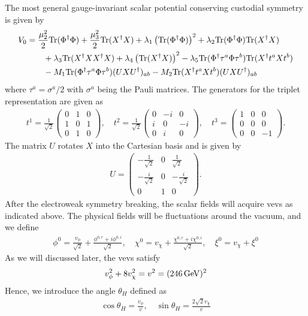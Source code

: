 \documentclass[12pt]{article}
\begin{document}
The most general gauge-invariant scalar potential conserving custodial symmetry is given by
\begin{align}
    \label{equ:V0}
    V_0 &= \frac{\mu_2^2}{2}{\rm Tr}(\Phi^\dagger\Phi)+\frac{\mu_3^2}{2}{\rm Tr}(X^\dagger X) + \lambda_1\left({\rm Tr}(\Phi^\dagger\Phi)\right)^2 + \lambda_2{\rm Tr}(\Phi^\dagger\Phi){\rm Tr}(X^\dagger X) \nonumber \\
    & \qquad + \lambda_3{\rm Tr}(X^\dagger X X^\dagger X) + \lambda_4\left({\rm Tr}(X^\dagger X)\right)^2 - \lambda_5{\rm Tr}(\Phi^\dagger \tau^a\Phi\tau^b){\rm Tr}(X^\dagger t^a X t^b) \nonumber \\
    &\qquad- M_1 {\rm Tr}(\Phi^\dagger \tau^a \Phi \tau^b)(UXU^\dagger)_{ab} - M_2 {\rm Tr}(X^\dagger t^a X t^b)(UXU^\dagger)_{ab}
\end{align}
where $\tau^a=\sigma^a/2$ with $\sigma^a$ being the Pauli matrices. The generators for the triplet representation are given as
\begin{align}
    t^1 = \frac{1}{\sqrt{2}}\begin{pmatrix}
        0 & 1 & 0 \\
        1 & 0 & 1 \\
        0 & 1 & 0
    \end{pmatrix}, \quad t^2=\frac{1}{\sqrt{2}}\begin{pmatrix}
        0 & -i & 0 \\
        i & 0 & -i \\
        0 & i & 0
    \end{pmatrix}, \quad t^3=\begin{pmatrix}
        1 & 0 & 0 \\
        0 & 0 & 0 \\
        0 & 0 & -1
    \end{pmatrix}.
\end{align}
The matrix $U$ rotates $X$ into the Cartesian basis and is given by
\begin{align}
    U = \begin{pmatrix}
        -\frac{1}{\sqrt{2}} & 0 & \frac{1}{\sqrt{2}}\\
        -\frac{i}{\sqrt{2}} & 0 & -\frac{i}{\sqrt{2}}\\
        0 & 1 & 0
    \end{pmatrix}.
\end{align}
After the electroweak symmetry breaking, the scalar fields will acquire vevs as indicated above. The physical fields will be fluctuations around the vacuum, and we define
\begin{align}
    \phi^0 = \frac{v_\phi}{\sqrt{2}} + \frac{\phi^{0,r}+i\phi^{0,i}}{\sqrt{2}}, \quad \chi^0 = v_\chi + \frac{\chi^{0,r}+i\chi^{0,i}}{\sqrt{2}}, \quad \xi^0 = v_\chi + \xi^0
\end{align}
As we will discussed later, the vevs satisfy
\begin{align}
    v_\phi^2 + 8v_\chi^2 = v^2 = (246\,{\rm GeV})^2
\end{align}
Hence, we introduce the angle $\theta_H$ defined as
\begin{align}
    \cos\theta_H = \frac{v_\phi}{v},\quad \sin\theta_H = \frac{2\sqrt{2}v_\chi}{v}
\end{align}
\end{document}
